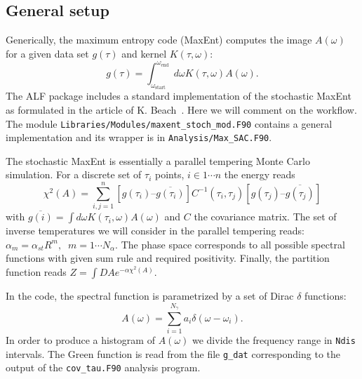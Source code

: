 


\subsection{General setup}
Generically, the maximum entropy code (MaxEnt) computes the  image  $A(\omega) $ for a given  data  set $g(\tau) $  and kernel $K(\tau,\omega) $:
\begin{equation}
g(\tau) =  \int_{\omega_\text{start}}^{\omega_\text{end}} d {\omega} K(\tau,\omega) A(\omega).
\end{equation} 
The  ALF package includes a standard implementation of the stochastic MaxEnt as formulated in the article of K. Beach~\cite{Beach04a}. Here we will comment on the workflow.  The module 
\texttt{Libraries/Modules/\allowbreak{}maxent\_stoch\_mod.F90} contains a general implementation and its wrapper is in \texttt{Analysis/Max\_SAC.F90}. 

The stochastic MaxEnt is essentially a parallel tempering Monte Carlo simulation.  For a discrete set of $\tau_i$ points,  $i \in 1 \cdots n $ the energy reads
\begin{equation}
  \chi^{2}(A) =  \sum_{i,j=1}^{n}   \left[ g(\tau_i)  –    \overline{g(\tau_i)} \right] C^{-1}(\tau_i,\tau_j) \left[    g(\tau_j)  –  \overline{g(\tau_j)} \right] 
\end{equation} with $ \overline{g(i)} =\int d{\omega} K(\tau_{i},\omega)  A(\omega)$ and  $C$ the covariance matrix. 
The set  of inverse temperatures  we will consider  in the parallel tempering reads:
$ \alpha_m = \alpha_{st}  R^{m}, \; \; m = 1 \cdots N_{\alpha} $.   The phase space corresponds to all possible spectral functions with given sum rule and required positivity.  Finally,  the partition function reads
$Z =  \int{DA} e^{-\alpha \chi^{2}(A)}$.  

In the code, the spectral function is parametrized  by a  set of Dirac $\delta$ functions: 
\begin{equation}
      A(\omega)  = \sum_{i=1}^{N_{\gamma}} a_{i} \delta \left( \omega - \omega_i \right).
\end{equation}
In order to produce a histogram of  $ A(\omega) $ we divide  the frequency range in \texttt{Ndis} intervals. 
The Green function is read from the file \texttt{g\_dat}  corresponding to the  output of the  \texttt{cov\_tau.F90} analysis program.

